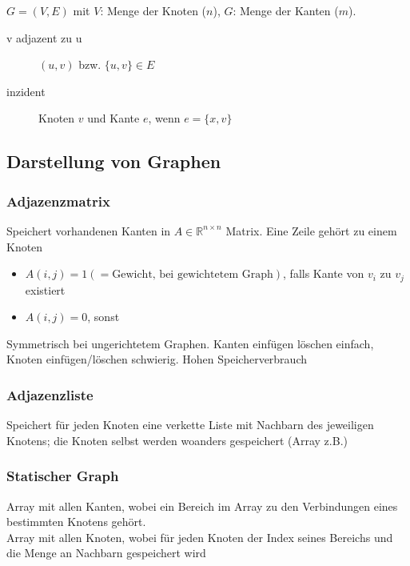 $G=(V,E)$ mit $V$: Menge der Knoten ($n$), $G$: Menge der Kanten ($m$).
\begin{sectionbox}
    \begin{description}
        \item[v adjazent zu u] $(u,v)$ bzw. $\{u,v\} \in E$
        \item[inzident] Knoten $v$ und Kante $e$, wenn $e=\{x,v\}$
    \end{description}
\end{sectionbox}

\subsection{Darstellung von Graphen}
\begin{sectionbox}
    \subsubsection{Adjazenzmatrix}
    Speichert vorhandenen Kanten in $A \in \mathbb R^{n\times n}$ Matrix. Eine Zeile gehört zu einem Knoten
    \begin{itemize}
        \item $A(i,j)=1(=\text{Gewicht, bei gewichtetem Graph})$, falls Kante von $v_i$ zu $v_j$ existiert
        \item $A(i,j)=0$, sonst
    \end{itemize}
    Symmetrisch bei ungerichtetem Graphen. Kanten einfügen löschen einfach, Knoten einfügen/löschen schwierig. Hohen Speicherverbrauch

    \subsubsection{Adjazenzliste}
    Speichert für jeden Knoten eine verkette Liste mit Nachbarn des jeweiligen Knotens; die Knoten selbst werden woanders gespeichert (Array z.B.) \\

    \subsubsection{Statischer Graph}
    Array mit allen Kanten, wobei ein Bereich im Array zu den Verbindungen eines bestimmten Knotens gehört. \\
    Array mit allen Knoten, wobei für jeden Knoten der Index seines Bereichs und die Menge an Nachbarn gespeichert wird
\end{sectionbox}
